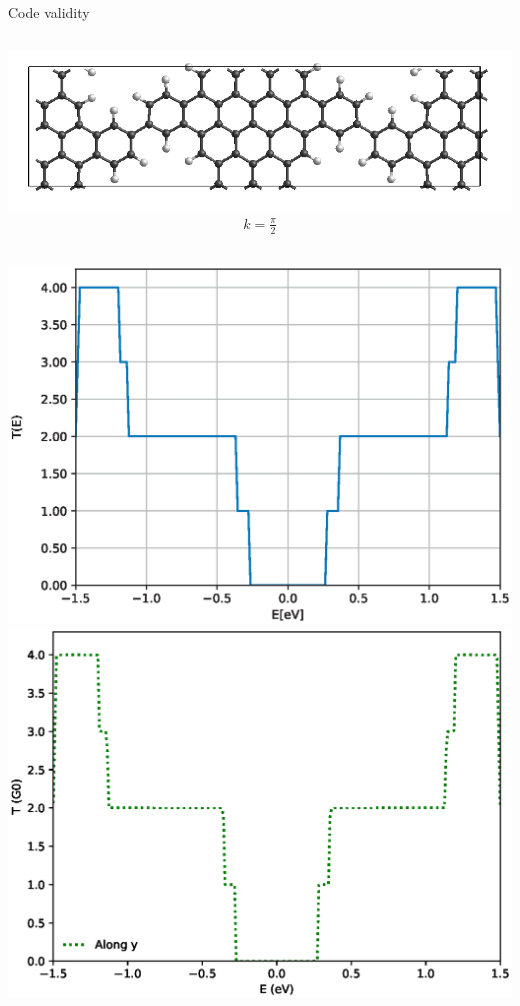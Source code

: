 \documentclass[hyperref={colorlinks=true,urlcolor=blue,linkcolor=.},aspectratio=1610,mathserif]{beamer}
\begin{document}
\begin{frame}{Code validity}
	\centering
	\begin{overprint}
		\centering
		\begin{columns}[c]
		\includegraphics[width=.7\textwidth]{Figures/NPG_synthesized.png}
		\begin{align*}
			k = \frac{\pi}{2}
		\end{align*}
		\end{columns}
		\begin{columns}[t]
			\includegraphics[width=.9\textwidth]{Figures/NPGNormal_pi-half.eps}
			\includegraphics[width=.87\textwidth]{Figures/txy_pi-half.eps}

\end{columns}
\end{overprint}
\end{frame}
\end{document}
